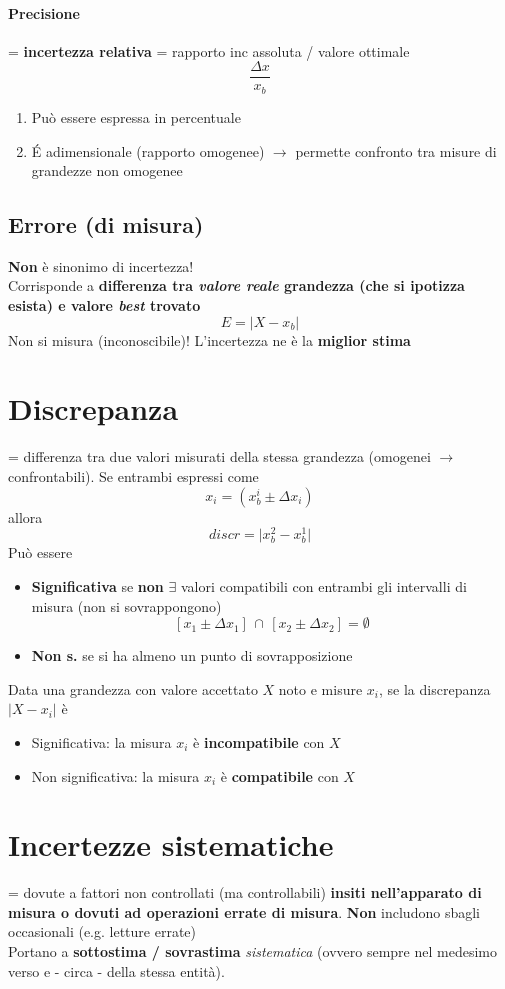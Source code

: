 \documentclass[10pt, oneside]{book}
\begin{document}
\paragraph{Precisione} = \textbf{incertezza relativa} = rapporto inc assoluta / valore ottimale
\[\frac{\Delta x}{x_b}\]
\begin{enumerate}
\item Può essere espressa in percentuale
\item \'E adimensionale (rapporto omogenee) $\rightarrow$ permette confronto tra misure di grandezze non omogenee
\end{enumerate}

\subsection{Errore (di misura)}
\textbf{Non} è sinonimo di incertezza!\\
Corrisponde a \textbf{differenza tra \textit{valore reale} grandezza (che si ipotizza esista) e valore \textit{best} trovato}
\[E = \big| X - x_b\big|\]
Non si misura (inconoscibile)! L'incertezza ne è la \textbf{miglior stima}

\section{Discrepanza}
= differenza tra due valori misurati della stessa grandezza (omogenei $\rightarrow$ confrontabili). Se entrambi espressi come 
\[x_i = (x_b^i \pm \Delta x_i)\]
allora
\[discr = \big| x_b^2 - x_b^1\big|\]
Può essere
\begin{itemize}
\item \textbf{Significativa} se \textbf{non} $\exists$ valori compatibili con entrambi gli intervalli di misura (non si sovrappongono)
\[ [x_1 \pm \Delta x_1] \, \cap \, [x_2 \pm \Delta x_2] = \emptyset \]
\item \textbf{Non s.} se si ha almeno un punto di sovrapposizione
\end{itemize}
Data una grandezza con valore accettato $X$ noto e misure $x_i$, se la discrepanza $\displaystyle \big| X - x_i \big|$ è
\begin{itemize}
\item Significativa: la misura $x_i$ è \textbf{incompatibile} con $X$
\item Non significativa: la misura $x_i$ è \textbf{compatibile} con $X$
\end{itemize}

\section{Incertezze sistematiche}
= dovute a fattori non controllati (ma controllabili) \textbf{insiti nell'apparato di misura o dovuti ad operazioni errate di misura}. \textbf{Non} includono sbagli occasionali (e.g. letture errate)\\
Portano a \textbf{sottostima / sovrastima} \textit{sistematica} (ovvero sempre nel medesimo verso e - circa - della stessa entità).
\end{document}
